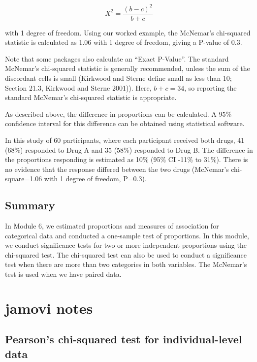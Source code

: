 \documentclass[
  a4paper,
]{memoir}
\begin{document}
\[ X^2 = \frac{(b-c)^2}{b+c} \]

with 1 degree of freedom. Using our worked example, the McNemar's
chi-squared statistic is calculated as 1.06 with 1 degree of freedom,
giving a P-value of 0.3.

Note that some packages also calculate an ``Exact P-Value''. The
standard McNemar's chi-squared statistic is generally recommended,
unless the sum of the discordant cells is small (Kirkwood and Sterne
define small as less than 10; Section 21.3, Kirkwood and Sterne 2001)).
Here, \(b + c = 34\), so reporting the standard McNemar's chi-squared
statistic is appropriate.

As described above, the difference in proportions can be calculated. A
95\% confidence interval for this difference can be obtained using
statistical software.

In this study of 60 participants, where each participant received both
drugs, 41 (68\%) responded to Drug A and 35 (58\%) responded to Drug B.
The difference in the proportions responding is estimated as 10\% (95\%
CI -11\% to 31\%). There is no evidence that the response differed
between the two drugs (McNemar's chi-square=1.06 with 1 degree of
freedom, P=0.3).

\section{Summary}\label{summary}

In Module 6, we estimated proportions and measures of association for
categorical data and conducted a one-sample test of proportions. In this
module, we conduct significance tests for two or more independent
proportions using the chi-squared test. The chi-squared test can also be
used to conduct a significance test when there are more than two
categories in both variables. The McNemar's test is used when we have
paired data.

\newpage{}


\chapter*{jamovi notes}\label{jamovi-notes-5}


\section{Pearson's chi-squared test for individual-level
data}\label{pearsons-chi-squared-test-for-individual-level-data}
\end{document}

